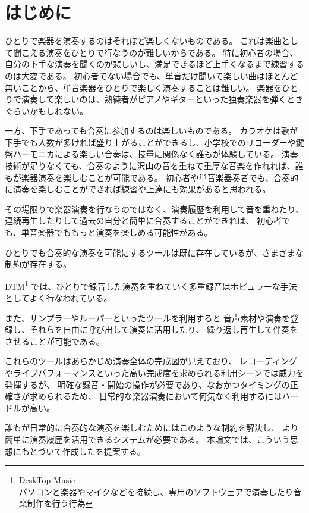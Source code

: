 \section{はじめに}
\label{sec:start}

ひとりで楽器を演奏するのはそれほど楽しくないものである。
これは楽曲として聞こえる演奏をひとりで行なうのが難しいからである。
特に初心者の場合、 自分の下手な演奏を聞くのが悲しいし、満足できるほど上手くなるまで練習するのは大変である。
初心者でない場合でも、単音だけ聞いて楽しい曲はほとんど無いことから、単音楽器をひとりで楽しく演奏することは難しい。
楽器をひとりで演奏して楽しいのは、熟練者がピアノやギターといった独奏楽器を弾くときぐらいかもしれない。

一方、下手であっても合奏に参加するのは楽しいものである。
カラオケは歌が下手でも人数が多ければ盛り上がることができるし、小学校でのリコーダーや鍵盤ハーモニカによる楽しい合奏は、技量に関係なく誰もが体験している。
演奏技術が足りなくても、合奏のように沢山の音を重ねて重厚な音楽を作れれば、誰もが楽器演奏を楽しむことが可能である。
初心者や単音楽器奏者でも、合奏的に演奏を楽しむことができれば練習や上達にも効果があると思われる。

その場限りで楽器演奏を行なうのではなく、演奏履歴を利用して音を重ねたり、連続再生したりして過去の自分と簡単に合奏することができれば、
初心者でも、単音楽器でももっと演奏を楽しめる可能性がある。

ひとりでも合奏的な演奏を可能にするツールは既に存在しているが、さまざまな制約が存在する。

DTM\footnote{\textsf{DeskTop Music\\パソコンと楽器やマイクなどを接続し、専用のソフトウェアで演奏したり音楽制作を行う行為}}
では、ひとりで録音した演奏を重ねていく多重録音はポピュラーな手法としてよく行なわれている。\cite{jacob} \cite{resound}

また、サンプラーやルーパーといったツールを利用すると
音声素材や演奏を登録し、それらを自由に呼び出して演奏に活用したり、
繰り返し再生して伴奏をさせることが可能である。

これらのツールはあらかじめ演奏全体の完成図が見えており、
レコーディングやライブパフォーマンスといった高い完成度を求められる利用シーンでは威力を発揮するが、
明確な録音・開始の操作が必要であり、なおかつタイミングの正確さが求められるため、
日常的な楽器演奏において何気なく利用するにはハードルが高い。

誰もが日常的に合奏的な演奏を楽しむためにはこのような制約を解決し、
より簡単に演奏履歴を活用できるシステムが必要である。
本論文では、こういう思想にもとづいて作成した{\system}を提案する。
